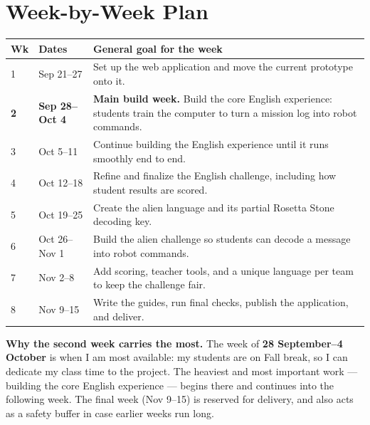 \documentclass[a4]{article}
\begin{document}
\section{Week-by-Week Plan}

\begin{center}
\renewcommand{\arraystretch}{1.5}
\begin{tabularx}{\linewidth}{@{}p{1.1cm}p{2.6cm}X@{}}
\toprule
\textbf{Wk} & \textbf{Dates} & \textbf{General goal for the week} \\
\midrule
\cellcolor{phase0}1 & Sep 21--27 & Set up the web application and move the current prototype onto it. \\
\cellcolor{heavyweek}\textbf{2} & \textbf{Sep 28--Oct 4} & \textbf{Main build week.} Build the core English experience: students train the computer to turn a mission log into robot commands. \\
\cellcolor{phase1}3 & Oct 5--11 & Continue building the English experience until it runs smoothly end to end. \\
\cellcolor{phase1}4 & Oct 12--18 & Refine and finalize the English challenge, including how student results are scored. \\
\cellcolor{phase2}5 & Oct 19--25 & Create the alien language and its partial Rosetta Stone decoding key. \\
\cellcolor{phase2}6 & Oct 26--Nov 1 & Build the alien challenge so students can decode a message into robot commands. \\
\cellcolor{phase2}7 & Nov 2--8 & Add scoring, teacher tools, and a unique language per team to keep the challenge fair. \\
\cellcolor{bufferc}8 & Nov 9--15 & Write the guides, run final checks, publish the application, and deliver. \\
\bottomrule
\end{tabularx}
\end{center}

\noindent \textbf{Why the second week carries the most.} The week of
\textbf{28 September--4 October} is when I am most available: my students are on
Fall break, so I can dedicate my class time to the project. The heaviest and most
important work --- building the core English experience --- begins there and
continues into the following week. The final week (Nov 9--15) is reserved for
delivery, and also acts as a safety buffer in case earlier weeks run long.

\end{document}
